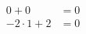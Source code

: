 \documentclass[preview]{standalone}
\begin{document}
\begin{align*}
0 + 0 & = 0\\- 2\cdot1 + 2 & = 0 \\
\end{align*}
\end{document}
